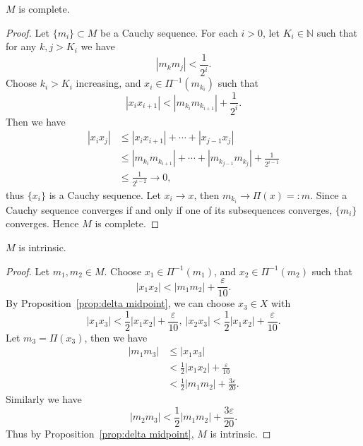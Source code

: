 \begin{lem}
    $M$ is complete.
\end{lem}
\begin{proof}
    Let $\{m_i\}\subset M$ be a Cauchy sequence.
    For each $i>0$, let $K_i\in\mathbb{N}$ such that for any $k,j>K_i$ we have
    \[|m_km_j|<\frac{1}{2^i}.\]
    Choose $k_i>K_i$ increasing, and $x_i\in\Pi^{-1}(m_{k_i})$ such that
    \[|x_ix_{i+1}|<|m_{k_i}m_{k_{i+1}}|+\frac{1}{2^i}.\]
    Then we have
    \begin{align*}
        |x_ix_j|&\leq|x_ix_{i+1}|+\cdots+|x_{j-1}x_j|\\
        &\leq|m_{k_i}m_{k_{i+1}}|+\cdots+|m_{k_{j-1}}m_{k_j}|+\frac{1}{2^{i-1}}\\
        &\leq\frac{1}{2^{i-2}}\to 0,
    \end{align*}
    thus $\{x_i\}$ is a Cauchy sequence.
    Let $x_i\to x$, then $m_{k_i}\to\Pi(x)=:m$.
    Since a Cauchy sequence converges if and only if one of its subsequences converges, $\{m_i\}$ converges.
    Hence $M$ is complete.
\end{proof}

\begin{lem}
    $M$ is intrinsic.
\end{lem}
\begin{proof}
    Let $m_1,m_2\in M$.
    Choose $x_1\in\Pi^{-1}(m_1)$, and $x_2\in\Pi^{-1}(m_2)$ such that
    \[|x_1x_2|<|m_1m_2|+\frac{\varepsilon}{10}.\]
    By Proposition~\ref{prop:delta midpoint}, we can choose $x_3\in X$ with
    \[|x_1x_3|<\frac{1}{2}|x_1x_2|+\frac{\varepsilon}{10},\ |x_2x_3|<\frac{1}{2}|x_1x_2|+\frac{\varepsilon}{10}.\]
    Let $m_3=\Pi(x_3)$, then we have
    \begin{align*}
        |m_1m_3|&\leq|x_1x_3|\\
        &<\frac{1}{2}|x_1x_2|+\frac{\varepsilon}{10}\\
        &<\frac{1}{2}|m_1m_2|+\frac{3\varepsilon}{20}.
    \end{align*}
    Similarly we have
    \[|m_2m_3|<\frac{1}{2}|m_1m_2|+\frac{3\varepsilon}{20}.\]
    Thus by Proposition~\ref{prop:delta midpoint}, $M$ is intrinsic.
\end{proof}


